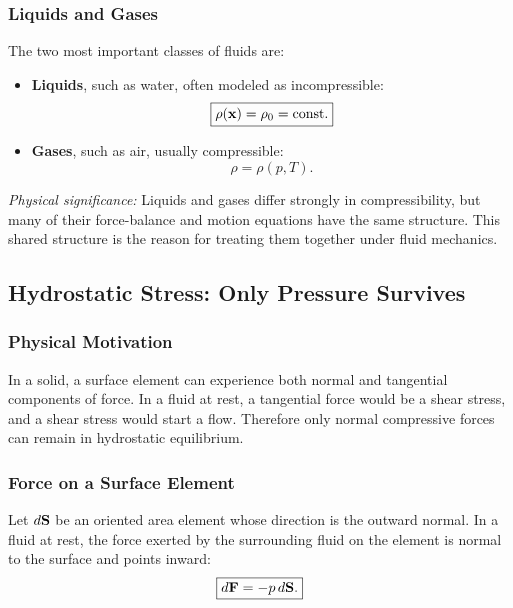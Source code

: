 \documentclass[../main.tex]{subfiles}
\begin{document}
\subsubsection*{Liquids and Gases}
The two most important classes of fluids are:
\begin{itemize}
  \item \textbf{Liquids}, such as water, often modeled as incompressible:
  \begin{equation}
    \boxed{\rho(\mathbf{x})=\rho_0=\mathrm{const}.}
    \label{eq:lec10_incompressible_definition}
  \end{equation}
  \item \textbf{Gases}, such as air, usually compressible:
  \begin{equation}
    \boxed{\rho=\rho(p,T).}
    \label{eq:lec10_compressible_definition}
  \end{equation}
\end{itemize}

\textit{Physical significance:} Liquids and gases differ strongly in compressibility, but many of their force-balance and motion equations have the same structure. This shared structure is the reason for treating them together under fluid mechanics.

\subsection{Hydrostatic Stress: Only Pressure Survives}\label{sec:lec10:hydrostatic-stress}

\subsubsection*{Physical Motivation}
In a solid, a surface element can experience both normal and tangential components of force. In a fluid at rest, a tangential force would be a shear stress, and a shear stress would start a flow. Therefore only normal compressive forces can remain in hydrostatic equilibrium.

\subsubsection*{Force on a Surface Element}
Let $d\mathbf{S}$ be an oriented area element whose direction is the outward normal. In a fluid at rest, the force exerted by the surrounding fluid on the element is normal to the surface and points inward:
\begin{equation}
  \boxed{d\mathbf{F}=-p\,d\mathbf{S}.}
  \label{eq:lec10_pressure_force}
\end{equation}
\end{document}
